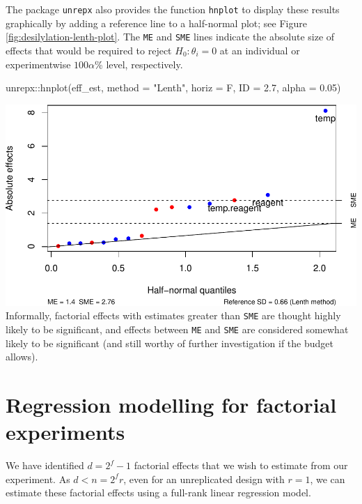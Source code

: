 \documentclass[
]{book}
\newenvironment{Shaded}{\begin{snugshade}}{\end{snugshade}}
\newcommand{\AttributeTok}[1]{\textcolor[rgb]{0.77,0.63,0.00}{#1}}
\newcommand{\FloatTok}[1]{\textcolor[rgb]{0.00,0.00,0.81}{#1}}
\newcommand{\FunctionTok}[1]{\textcolor[rgb]{0.00,0.00,0.00}{#1}}
\newcommand{\NormalTok}[1]{#1}
\newcommand{\SpecialCharTok}[1]{\textcolor[rgb]{0.00,0.00,0.00}{#1}}
\newcommand{\StringTok}[1]{\textcolor[rgb]{0.31,0.60,0.02}{#1}}
\theoremstyle{definition}
\theoremstyle{definition}
\theoremstyle{definition}
\theoremstyle{definition}
\theoremstyle{remark}
\begin{document}
The package \texttt{unrepx} also provides the function \texttt{hnplot} to display these results graphically by adding a reference line to a half-normal plot; see Figure \ref{fig:desilylation-lenth-plot}. The \texttt{ME} and \texttt{SME} lines indicate the absolute size of effects that would be required to reject \(H_0: \theta_i = 0\) at an individual or experimentwise \(100\alpha\)\% level, respectively.

\begin{Shaded}
\begin{Highlighting}[]
\NormalTok{unrepx}\SpecialCharTok{::}\FunctionTok{hnplot}\NormalTok{(eff\_est, }\AttributeTok{method =} \StringTok{"Lenth"}\NormalTok{, }\AttributeTok{horiz =}\NormalTok{ F, }\AttributeTok{ID =} \FloatTok{2.7}\NormalTok{, }\AttributeTok{alpha =} \FloatTok{0.05}\NormalTok{)}
\end{Highlighting}
\end{Shaded}

\includegraphics{bookdown_math3014-6027_files/figure-latex/desilylation-lenth-plot-1.pdf}
Informally, factorial effects with estimates greater than \texttt{SME} are thought highly likely to be significant, and effects between \texttt{ME} and \texttt{SME} are considered somewhat likely to be significant (and still worthy of further investigation if the budget allows).

\hypertarget{regression-modelling-for-factorial-experiments}{%
\section{Regression modelling for factorial experiments}\label{regression-modelling-for-factorial-experiments}}

We have identified \(d = 2^f-1\) factorial effects that we wish to estimate from our experiment. As \(d < n = 2^fr\), even for an unreplicated design with \(r=1\), we can estimate these factorial effects using a full-rank linear regression model.
\end{document}
